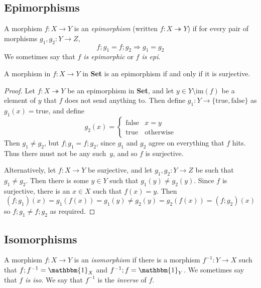 \documentclass{lecturenotes}
\newcommand{\id}[1][]{\ensuremath{\mathbbm{1}_{#1}}}
\newcommand{\Set}{\textbf{Set}\xspace}
\begin{document}
\subsection{Epimorphisms}
\label{sec:epimorphisms}

\begin{defn}[Epimorphism]
  A morphism $f : X \to Y$ is an \emph{epimorphism} (written $f : X \twoheadrightarrow Y$) if for every pair of morphisms $g_1, g_2 : Y \to Z$, $$f; g_1 = f;g_2 \Rightarrow g_1 = g_2$$
  We sometimes say that \emph{$f$ is epimorphic} or \emph{$f$ is epi}.
\end{defn}

\begin{thm}[Epimorphisms in \Set]
  A morphism in $f : X \to Y$ in \Set is an epimorphism if and only if it is surjective.
\end{thm}
\begin{proof}
  Let $f : X \twoheadrightarrow Y$ be an epimorphism in \Set, and let $y \in Y \setminus \text{im}(f)$ be a element of $y$ that $f$ does not send anything to.
  Then define $g_1 : Y \to \{\text{true}, \text{false}\}$ as $g_1(x) = \text{true}$, and define $$g_2(x) = \left\{\begin{array}{ll} \text{false} & x = y\\\text{true} & \text{otherwise}\end{array}\right.$$
  Then $g_1 \neq g_2$, but $f; g_1 = f; g_2$, since $g_1$ and $g_2$ agree on everything that $f$ hits.
  Thus there must not be any such~$y$, and so $f$ is surjective.

  Alternatively, let $f : X \to Y$ be surjective, and let $g_1, g_2 : Y \to Z$ be such that $g_1 \neq g_2$.
  Then there is some $y \in Y$ such that $g_1(y) \neq g_2(y)$.
  Since $f$ is surjective, there is an $x \in X$ such that $f(x) = y$.
  Then $$(f; g_1)(x) = g_1(f(x)) = g_1(y) \neq g_2(y) = g_2(f(x)) = (f; g_2)(x)$$ so $f;g_1 \neq f; g_2$ as required.
\end{proof}

\subsection{Isomorphisms}
\label{sec:isomorphisms}

\begin{defn}[Isomorphism]
  A morphism $f : X \to Y$ is an \emph{isomorphism} if there is a morphism $f^{-1} : Y \to X$ such that $f; f^{-1} = \id[X]$ and $f^{-1}; f = \id[Y]$.
  We sometimes say that \emph{$f$ is iso}.
  We say that $f^{-1}$ is the \emph{inverse} of $f$.
\end{defn}
\end{document}
